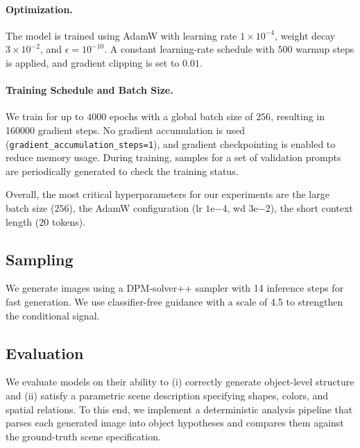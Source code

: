 \paragraph{Optimization.}
The model is trained using AdamW with learning rate $1\times 10^{-4}$, weight decay $3\times 10^{-2}$, and $\epsilon=10^{-10}$. A constant learning-rate schedule with $500$ warmup steps is applied, and gradient clipping is set to $0.01$. %

\paragraph{Training Schedule and Batch Size.}
We train for up to $4000$ epochs with a global batch size of $256$, resulting in 160000 gradient steps. 
No gradient accumulation is used (\texttt{gradient\_accumulation\_steps=1}), and gradient checkpointing is enabled to reduce memory usage. %
During training, samples for a set of validation prompts are periodically generated to check the training status. %

Overall, the most critical hyperparameters for our experiments are the large batch size ($256$), the AdamW configuration (lr $1\mathrm{e}{-4}$, wd $3\mathrm{e}{-2}$), the short context length ($20$ tokens).%

\subsection{Sampling}\label{method:sampling}
We generate images using a DPM-solver++\cite{lu2022dpm++} sampler with 14 inference steps for fast generation. We use classifier-free guidance \cite{ho2022classifierFreeGuidance} with a scale of 4.5 to strengthen the conditional signal. 

\subsection{Evaluation}\label{method:evaluation}
We evaluate models on their ability to (i) correctly generate object-level structure and (ii) satisfy a parametric scene description specifying shapes, colors, and spatial relations. To this end, we implement a deterministic analysis pipeline that parses each generated image into object hypotheses and compares them against the ground-truth scene specification.

